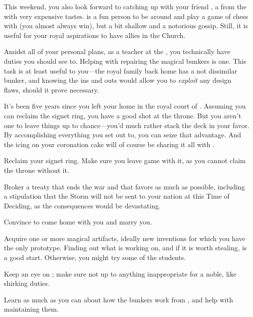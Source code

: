 \documentclass[char]{GL2020}
\begin{document}
This weekend, you also look forward to catching up with your friend \cHedonist{\full}, a \cHedonist{\cleric} from the \pFarm{} with very expensive tastes. \cHedonist{} is a fun person to be around and play a game of chess with (you almost always win), but a bit shallow and a notorious gossip. Still, it is useful for your royal aspirations to have allies in the Church.

Amidst all of your personal plans, as a teacher at the \pSc{}, you technically have duties you should see to. Helping \cBunker{\full} with repairing the magical bunkers is one. This task is at least useful to you---the royal family back home has a not dissimilar bunker, and knowing the ins and outs would allow you to \emph{exploit} any design flaws, should it prove necessary.

It's been five years since you left your home in the royal court of \pFarm{}. Assuming you can reclaim the signet ring, you have a good shot at the throne. But you aren't one to leave things up to chance---you'd much rather stack the deck in your favor. By accomplishing everything you set out to, you can seize that advantage. And the icing on your coronation cake will of course be sharing it all with \cPirate{}.

\begin{itemz}
	\item Reclaim your signet ring. Make sure you leave game with it, as you cannot claim the \pFarm{} throne without it.
\item Broker a treaty that ends the war and that favors \pFarm{} as much as possible, including a stipulation that the Storm will not be sent to your nation at this Time of Deciding, as the consequences would be devastating.
\item Convince \cPirate{} to come home with you and marry you.
\item Acquire one or more magical artifacts, ideally new inventions for which you have the only prototype. Finding out what \cCurse{} is working on, and if it is worth stealing, is a good start. Otherwise, you might try some of the \pTech{} students.
	\item Keep an eye on \cAdopted{}; make sure \cAdopted{\they} \cAdopted{\are} not up to anything inappropriate for a noble, like shirking \cAdopted{\their} duties.
\item Learn as much as you can about how the bunkers work from \cBunker{}, and help with maintaining them.
\end{itemz}
\end{document}
